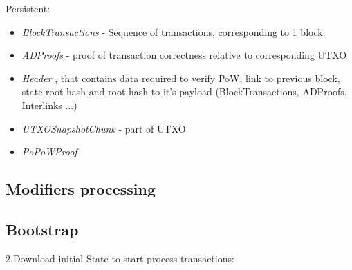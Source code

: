 \documentclass[]{report}   %
\begin{document}
Persistent:
\begin{itemize}
  \item{\em BlockTransactions}  - Sequence of transactions, corresponding to 1 block.
  \item{\em ADProofs} - proof of transaction correctness relative to corresponding UTXO
  \item{\em Header} , that contains data required to verify PoW, link to previous block, state root hash and root hash to it's payload (BlockTransactions, ADProofs, Interlinks ...)
  \item{\em UTXOSnapshotChunk} - part of UTXO
  \item{\em PoPoWProof}
\end{itemize}

\subsection{Modifiers processing}




\subsection{Bootstrap}



2.Download initial State to start process transactions:

\end{document}
